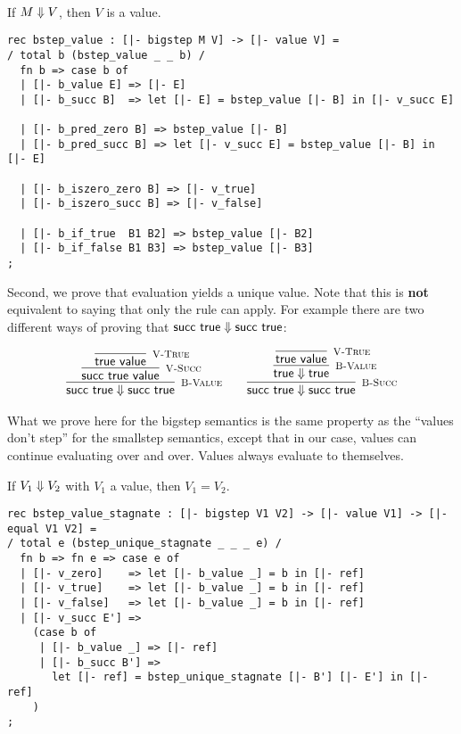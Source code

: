 \begin{lemma}
  \label{lem:bstep-value-soundness}
  ~\\If $M \Downarrow V$, then $V$ is a value.
\end{lemma}

\begin{lstlisting}
rec bstep_value : [|- bigstep M V] -> [|- value V] =
/ total b (bstep_value _ _ b) /
  fn b => case b of 
  | [|- b_value E] => [|- E]
  | [|- b_succ B]  => let [|- E] = bstep_value [|- B] in [|- v_succ E]

  | [|- b_pred_zero B] => bstep_value [|- B]
  | [|- b_pred_succ B] => let [|- v_succ E] = bstep_value [|- B] in [|- E]

  | [|- b_iszero_zero B] => [|- v_true]
  | [|- b_iszero_succ B] => [|- v_false]

  | [|- b_if_true  B1 B2] => bstep_value [|- B2]
  | [|- b_if_false B1 B3] => bstep_value [|- B3]
;
\end{lstlisting}

Second, we  prove that evaluation yields a unique value. Note that
this is {\bf not} equivalent to saying that only the \BValue rule can
apply. For example there are two different ways of proving that 
$\textsf{succ}~\textsf{true} \Downarrow \textsf{succ}~\textsf{true}$:

\[
\begin{array}{c@{\qquad}c}
  \infer[\BValue]{\tmsucc \tmtrue \BSteps \tmsucc \tmtrue}
  {\infer[\VSucc]{\tmsucc \tmtrue \Value}
    {\infer[\VTrue]{\tmtrue \Value}{}}} &

  \infer[\BSucc]{\tmsucc \tmtrue \BSteps \tmsucc \tmtrue}
  {\infer[\BValue]{\tmtrue \BSteps \tmtrue}
    {\infer[\VTrue]{\tmtrue \Value}{}}}
\end{array}
\]

What we prove here for the bigstep semantics is the same property as the
``values don't step'' for the smallstep semantics, except that in our case,
values can continue evaluating over and over. Values always
evaluate to themselves.

\begin{lemma}
  \label{lem:bstep-values-stagnate}
  If $V_1 \Downarrow V_2$ with $V_1$ a value, then $V_1 = V_2$.
\end{lemma}

\begin{lstlisting}
rec bstep_value_stagnate : [|- bigstep V1 V2] -> [|- value V1] -> [|- equal V1 V2] =
/ total e (bstep_unique_stagnate _ _ _ e) /
  fn b => fn e => case e of 
  | [|- v_zero]    => let [|- b_value _] = b in [|- ref]
  | [|- v_true]    => let [|- b_value _] = b in [|- ref]
  | [|- v_false]   => let [|- b_value _] = b in [|- ref]
  | [|- v_succ E'] =>
    (case b of 
     | [|- b_value _] => [|- ref]
     | [|- b_succ B'] =>
       let [|- ref] = bstep_unique_stagnate [|- B'] [|- E'] in [|- ref]
    )
;
\end{lstlisting}

